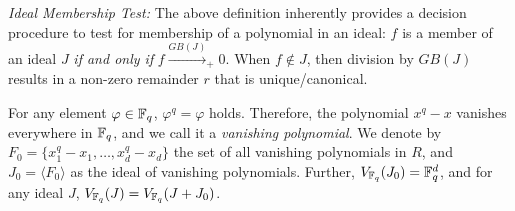 

{\it Ideal Membership Test:} The above definition inherently provides
a decision procedure to test for membership of a polynomial in an ideal:
$f$ is a member of an ideal $J$ {\it if and only if} 
$f\xrightarrow{GB(J)}_+0$.
When $f\notin J$,
then division by $GB(J)$ results in a non-zero remainder $r$ that is
unique/canonical. 



For any element $\varphi\in{\mathbb{F}}_{q}$,
$\varphi^q=\varphi$ holds. Therefore, the polynomial $x^q-x$ vanishes
everywhere in ${\mathbb{F}}_{q}$, and we call it a {\it vanishing polynomial}. We
denote by $F_0 = \{x_1^q-x_1,\dots,x_d^q-x_d\}$ the set of all vanishing
polynomials in $R$, and  $J_0 = \langle F_0 \rangle$
as the ideal of vanishing polynomials. Further,
$V_{{\mathbb{F}}_{q}}(J_0) = {\mathbb{F}}_{q}^d$, and for any ideal $J$,
$V_{{\mathbb{F}}_{q}}(J)=V_{{\mathbb{F}}_{q}}(J+J_0)$. 

